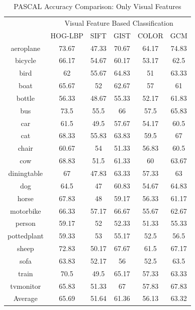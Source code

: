 \begin{table}
\centering
\caption{ PASCAL Accuracy Comparison: Only Visual Features} %
\vspace*{0.2 cm}
\begin{tabular}{| c | c | c | c | c | c |}
\hline
 {\multirow{2}{*}{Labels}} & \multicolumn{5}{|c|}{Visual Feature Based Classification} \\ 
 \cline{2-6}
  & HOG-LBP & SIFT & GIST & COLOR & GCM \\  [1ex] \hline
aeroplane & 73.67 & 47.33 & 70.67 & 64.17 & 74.83 \\  [1ex] \hline
bicycle & 66.17 & 54.67 & 60.17 & 53.17 & 62.5 \\  [1ex] \hline
bird & 62 & 55.67 & 64.83 & 51 & 63.33 \\  [1ex] \hline
boat & 65.67 & 52 & 62.67 & 57 & 61 \\  [1ex] \hline
bottle & 56.33 & 48.67 & 55.33 & 52.17 & 61.83 \\  [1ex] \hline
bus & 73.5 & 55.5 & 66 & 57.5 & 65.83 \\  [1ex] \hline
car & 61.5 & 49.5 & 57.67 & 54.17 & 60.5 \\  [1ex] \hline
cat & 68.33 & 55.83 & 63.83 & 59.5 & 67 \\  [1ex] \hline
chair & 60.67 & 54 & 51.33 & 56.83 & 60.5 \\  [1ex] \hline
cow & 68.83 & 51.5 & 61.33 & 60 & 63.67 \\  [1ex] \hline
diningtable & 67 & 47.83 & 63.33 & 57.33 & 63 \\  [1ex] \hline
dog & 64.5 & 47 & 60.83 & 54.67 & 64.83 \\  [1ex] \hline
horse & 67.83 & 48 & 59.17 & 56.33 & 61.17 \\  [1ex] \hline
motorbike & 66.33 & 57.17 & 66.67 & 55.67 & 62.67 \\  [1ex] \hline
person & 59.17 & 52 & 52.33 & 51.33 & 55.33 \\  [1ex] \hline
pottedplant & 59.33 & 53 & 55.17 & 52.5 & 56.5 \\  [1ex] \hline
sheep & 72.83 & 50.17 & 67.67 & 61.5 & 67.17 \\  [1ex] \hline
sofa & 63.83 & 52.17 & 56 & 52.5 & 63.5 \\  [1ex] \hline
train & 70.5 & 49.5 & 65.17 & 57.33 & 63.33 \\  [1ex] \hline
tvmonitor & 65.83 & 51.33 & 67 & 57.83 & 67.83 \\  [1ex] \hline
Average & 65.69 & 51.64 & 61.36 & 56.13 & 63.32 \\  [1ex] \hline
\end{tabular}
\label{PASCALAccuracyVisual} %
\end{table}

